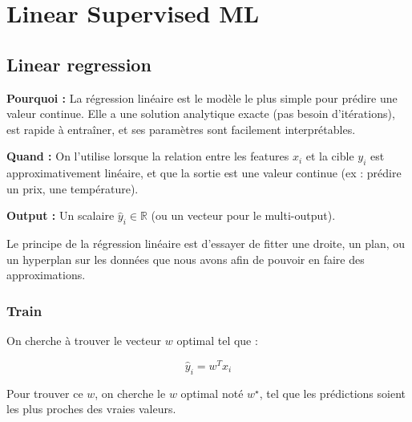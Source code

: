 \documentclass[11pt,a4paper,openany]{book}
\begin{document}
\chapter{Linear Supervised ML}

\section{Linear regression}

\begin{rembox}[title=Pourquoi et quand utiliser la régression linéaire ?]
\textbf{Pourquoi :} La régression linéaire est le modèle le plus simple pour prédire une valeur continue. Elle a une solution analytique exacte (pas besoin d'itérations), est rapide à entraîner, et ses paramètres sont facilement interprétables.

\vspace{0.3cm}

\textbf{Quand :} On l'utilise lorsque la relation entre les features $x_i$ et la cible $y_i$ est approximativement linéaire, et que la sortie est une valeur continue (ex : prédire un prix, une température).

\vspace{0.3cm}

\textbf{Output :} Un scalaire $\hat{y}_i \in \mathbb{R}$ (ou un vecteur pour le multi-output).
\end{rembox}

Le principe de la régression linéaire est d'essayer de fitter une droite, un plan, ou un hyperplan sur les données que nous avons afin de pouvoir en faire des approximations.

\vspace{0.4cm}

\subsection{Train}

On cherche à trouver le vecteur $w$ optimal tel que :

\[
\hat{y}_i = w^T x_i
\]

Pour trouver ce $w$, on cherche le $w$ optimal noté $w^\star$, tel que les prédictions soient les plus proches des vraies valeurs.

\vspace{0.6cm}
\end{document}
